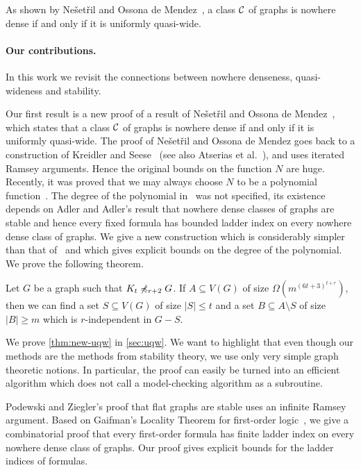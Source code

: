 As shown by Ne\v{s}et\v{r}il and Ossona de Mendez~\cite{nevsetvril2010first},
a class $\mathcal{C}$ of graphs is nowhere dense if and only if it
is uniformly quasi-wide.

\paragraph{Our contributions.} In this work we revisit the 
connections between nowhere denseness, quasi-wideness and
stability. 

Our first result is  a new proof of a result of
Ne\v{s}et\v{r}il and Ossona de Mendez~\cite{nevsetvril2010first},
which states that a class $\mathcal{C}$ of graphs is nowhere dense if and only if it
is uniformly quasi-wide. The proof of Ne\v{s}et\v{r}il 
and Ossona de Mendez goes back to a construction
of Kreidler and Seese~\cite{kreidler1998monadic} (see also Atserias et al.~\cite{atserias2006preservation}), 
and uses iterated Ramsey arguments. Hence the original bounds on 
the function $N$ are huge. Recently, 
it was proved that we may always choose $N$ to be a polynomial 
function~\cite{siebertz2016polynomial}. The degree of the polynomial 
in~\cite{siebertz2016polynomial} was  not specified, its existence 
depends on Adler and Adler's result that nowhere dense classes of graphs
are stable and hence every fixed formula has bounded ladder index 
on every nowhere dense class of graphs. We give a new construction 
which is considerably simpler than that of~\cite{siebertz2016polynomial}
and which gives explicit bounds on the degree of the polynomial. 
We prove the following theorem. 

\begin{theorem}\label{thm:new-uqw}
Let $G$ be a graph such that $K_t\not\preccurlyeq_{r+2} G$. 
If $A\subseteq V(G)$ of size $\Omega(m^{(6t+3)^{t+r}})$, then we can find a set
$S\subseteq V(G)$ of size $|S|\leq t$ and a set $B\subseteq A\setminus S$ 
of size $|B|\geq m$ which is $r$-independent in $G-S$.  
\end{theorem}

We prove \cref{thm:new-uqw} in \cref{sec:uqw}. We want to highlight
that even though our methods are the methods from stability theory, 
we use only very simple graph theoretic notions. In particular, the
proof can easily be turned into an efficient algorithm which does not
call a model-checking algorithm as a subroutine. 

\bigskip
Podewski and Ziegler's proof that flat graphs are stable uses an 
infinite Ramsey argument. Based on Gaifman's Locality Theorem for
first-order logic~\cite{gaifman1982local}, we give a combinatorial 
proof that every first-order formula has finite ladder index on every
nowhere dense class of graphs. Our proof gives explicit bounds for the
ladder indices of formulas. 

